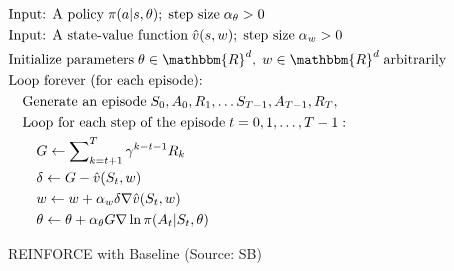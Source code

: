 \begin{figure}
\small
\begin{pseudocodebox}
\vspace{-\baselineskip}
\begin{align*}
& \text{Input: A policy}\;\pi(a | s, \theta);\;\text{step size}\; \alpha_\theta > 0 \\
& \text{Input: A state-value function}\;\hat{v}(s, w);\;\text{step size}\; \alpha_w > 0 \\
& \text{Initialize parameters}\; \theta \in \mathbbm{R}^d,\; w \in \mathbbm{R}^d\;\text{arbitrarily} \\
& \text{Loop forever (for each episode):} \\
& \quad \text{Generate an episode}\; S_0, A_0, R_1, \ldots S_{T-1}, A_{T-1}, R_T, \hspace{1in} \\
& \quad \text{Loop for each step of the episode}\;t=0, 1, \ldots, T-1:\\
& \quad \quad G \leftarrow \sum\nolimits_{k=t+1}^T \gamma^{k - t - 1}R_k \\
& \quad \quad \delta \leftarrow G - \hat{v}(S_t, w) \\
& \quad \quad w \leftarrow w + \alpha_w \delta \nabla \hat{v}(S_t, w) \\
& \quad \quad \theta \leftarrow \theta + \alpha_\theta G \nabla \ln \pi(A_t | S_t, \theta)
\end{align*}
\end{pseudocodebox}
\caption[REINFORCE with Baseline]{REINFORCE with Baseline (Source: SB)}
\label{fig:reinforcebaseline}
\end{figure}

